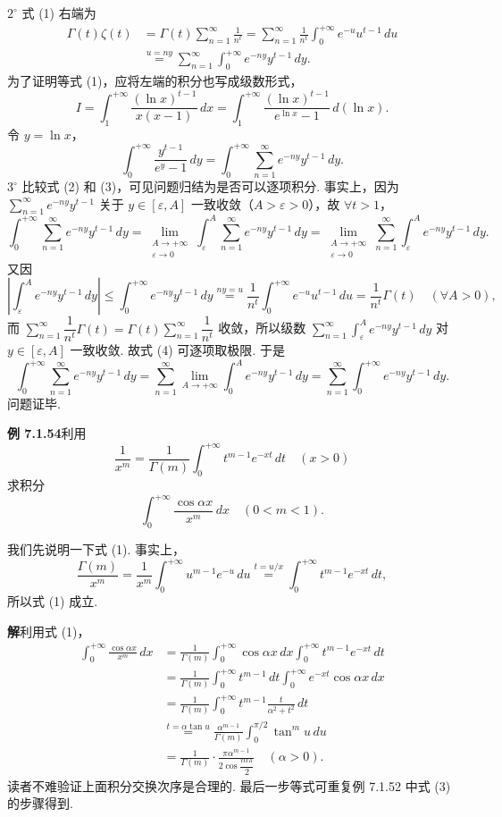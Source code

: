 \documentclass[UTF8, 12pt, fontset=fandol, oneside]{ctexart}
\begin{document}
$2^\circ$ 式 (1) 右端为
\[
\begin{aligned}
\Gamma(t)\zeta(t)
&=\Gamma(t)\sum_{n=1}^{\infty}\frac1{n^t}
=\sum_{n=1}^{\infty}\frac1{n^t}\int_0^{+\infty}e^{-u}u^{t-1}\,du\\
&\overset{u=ny}{=}\sum_{n=1}^{\infty}\int_0^{+\infty}e^{-ny}y^{t-1}\,dy.
\end{aligned}
\tag{2}
\]
为了证明等式 (1)，应将左端的积分也写成级数形式，
\[
I=\int_1^{+\infty}\frac{(\ln x)^{t-1}}{x(x-1)}\,dx
=\int_1^{+\infty}\frac{(\ln x)^{t-1}}{e^{\ln x}-1}\,d(\ln x).
\]
令 $y=\ln x$，
\[
\int_0^{+\infty}\frac{y^{t-1}}{e^y-1}\,dy
=\int_0^{+\infty}\sum_{n=1}^{\infty}e^{-ny}y^{t-1}\,dy.
\tag{3}
\]
$3^\circ$ 比较式 (2) 和 (3)，可见问题归结为是否可以逐项积分. 事实上，因为 $\sum\limits_{n=1}^{\infty}e^{-ny}y^{t-1}$ 关于 $y\in[\varepsilon,A]$ 一致收敛（$A>\varepsilon>0$），故 $\forall t>1$，
\[
\int_0^{+\infty}\sum_{n=1}^{\infty}e^{-ny}y^{t-1}\,dy
=\lim_{\substack{A\to+\infty\\ \varepsilon\to0}}\int_{\varepsilon}^{A}\sum_{n=1}^{\infty}e^{-ny}y^{t-1}\,dy
=\lim_{\substack{A\to+\infty\\ \varepsilon\to0}}\sum_{n=1}^{\infty}\int_{\varepsilon}^{A}e^{-ny}y^{t-1}\,dy.
\tag{4}
\]
又因
\[
\left|\int_{\varepsilon}^{A}e^{-ny}y^{t-1}\,dy\right|
\le \int_0^{+\infty}e^{-ny}y^{t-1}\,dy
\overset{ny=u}{=}\frac1{n^t}\int_0^{+\infty}e^{-u}u^{t-1}\,du
=\frac1{n^t}\Gamma(t)\quad(\forall A>0),
\]
而 $\sum\limits_{n=1}^{\infty}\dfrac1{n^t}\Gamma(t)=\Gamma(t)\sum\limits_{n=1}^{\infty}\dfrac1{n^t}$ 收敛，所以级数
$\sum\limits_{n=1}^{\infty}\int_{\varepsilon}^{A}e^{-ny}y^{t-1}\,dy$ 对 $y\in[\varepsilon,A]$ 一致收敛. 故式 (4) 可逐项取极限. 于是
\[
\int_0^{+\infty}\sum_{n=1}^{\infty}e^{-ny}y^{t-1}\,dy
=\sum_{n=1}^{\infty}\lim_{A\to+\infty}\int_0^A e^{-ny}y^{t-1}\,dy
=\sum_{n=1}^{\infty}\int_0^{+\infty}e^{-ny}y^{t-1}\,dy.
\]
问题证毕.

\noindent\textbf{例 7.1.54}\quad 利用
\[
\frac1{x^m}=\frac1{\Gamma(m)}\int_0^{+\infty}t^{m-1}e^{-xt}\,dt\quad(x>0)
\tag{1}
\]
求积分
\[
\int_0^{+\infty}\frac{\cos\alpha x}{x^m}\,dx\quad(0<m<1).
\]

我们先说明一下式 (1). 事实上，
\[
\frac{\Gamma(m)}{x^m}
=\frac1{x^m}\int_0^{+\infty}u^{m-1}e^{-u}\,du
\overset{t=u/x}{=}\int_0^{+\infty}t^{m-1}e^{-xt}\,dt,
\]
所以式 (1) 成立.

\noindent\textbf{解}\quad 利用式 (1)，
\[
\begin{aligned}
\int_0^{+\infty}\frac{\cos\alpha x}{x^m}\,dx
&=\frac1{\Gamma(m)}\int_0^{+\infty}\cos\alpha x\,dx\int_0^{+\infty}t^{m-1}e^{-xt}\,dt\\
&=\frac1{\Gamma(m)}\int_0^{+\infty}t^{m-1}\,dt\int_0^{+\infty}e^{-xt}\cos\alpha x\,dx\\
&=\frac1{\Gamma(m)}\int_0^{+\infty}t^{m-1}\frac{t}{\alpha^2+t^2}\,dt\\
&\overset{t=\alpha\tan u}{=}\frac{\alpha^{m-1}}{\Gamma(m)}
\int_0^{\pi/2}\tan^m u\,du\\
&=\frac1{\Gamma(m)}\cdot\frac{\pi\alpha^{m-1}}{2\cos\dfrac{m\pi}{2}}\quad(\alpha>0).
\end{aligned}
\]
读者不难验证上面积分交换次序是合理的. 最后一步等式可重复例 7.1.52 中式 (3) 的步骤得到.
\end{document}
